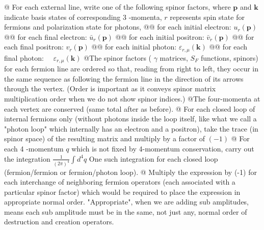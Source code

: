 \begin{itemize}
\begin{easylist}
    @ For each external line, write one of the following spinor factors, where $\mathbf{p}$ and $\mathbf{k}$ indicate basis states of corresponding 3 -momenta, $r$ represents spin state for fermions and polarization state for photons,
    @@ for each initial electron: $u_{r}(\mathbf{p})$
@@ for each final electron: $\bar{u}_{r}(\mathbf{p})$
@@ for each initial positron: $\bar{v}_{r}(\mathbf{p})$
@@ for each final positron: $v_{r}(\mathbf{p})$
@@ for each initial photon: $\varepsilon_{r, \mu}(\mathbf{k})$
@@ for each final photon: $\quad \varepsilon_{r, \mu}(\mathbf{k})$
@The spinor factors ( $\gamma$ matrices, $S_{F}$ functions, spinors) for each fermion line are ordered so that, reading from right to left, they occur in the same sequence as following the fermion line in the direction of its arrows through the vertex. (Order is important as it conveys spinor matrix multiplication order when we do not show spinor indices.)
@The four-momenta at each vertex are conserved (same total after as before).
@ For each closed loop of internal fermions only (without photons inside the loop itself, like what we call a "photon loop" which internally has an electron and a positron), take the trace (in spinor space) of the resulting matrix and multiply by a factor of $(-1)$
@ For each 4 -momentum $q$ which is not fixed by 4-momentum conservation, carry out the integration $\frac{1}{(2 \pi)^{4}} \int d^{4} q$ One such integration for each closed loop (fermion/fermion or fermion/photon loop).
@ Multiply the expression by (-1) for each interchange of neighboring fermion operators (each associated with a particular spinor factor) which would be required to place the expression in appropriate normal order. "Appropriate", when we are adding sub amplitudes, means each sub amplitude must be in the same, not just any, normal order of destruction and creation operators.
\end{easylist}

\end{itemize}